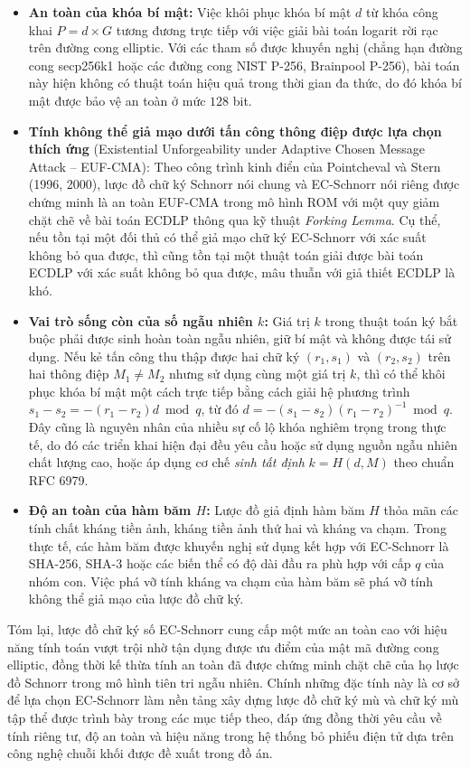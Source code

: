 \begin{itemize}
    \item \textbf{An toàn của khóa bí mật:} Việc khôi phục khóa bí mật $d$ từ khóa công khai $P = d \times G$ tương đương trực tiếp với việc giải bài toán logarit rời rạc trên đường cong elliptic. Với các tham số được khuyến nghị (chẳng hạn đường cong secp256k1 hoặc các đường cong NIST P-256, Brainpool P-256), bài toán này hiện không có thuật toán hiệu quả trong thời gian đa thức, do đó khóa bí mật được bảo vệ an toàn ở mức $128$ bit.

    \item \textbf{Tính không thể giả mạo dưới tấn công thông điệp được lựa chọn thích ứng} (Existential Unforgeability under Adaptive Chosen Message Attack -- EUF-CMA): Theo công trình kinh điển của Pointcheval và Stern (1996, 2000), lược đồ chữ ký Schnorr nói chung và EC-Schnorr nói riêng được chứng minh là an toàn EUF-CMA trong mô hình ROM với một quy giảm chặt chẽ về bài toán ECDLP thông qua kỹ thuật \textit{Forking Lemma}. Cụ thể, nếu tồn tại một đối thủ có thể giả mạo chữ ký EC-Schnorr với xác suất không bỏ qua được, thì cũng tồn tại một thuật toán giải được bài toán ECDLP với xác suất không bỏ qua được, mâu thuẫn với giả thiết ECDLP là khó.

    \item \textbf{Vai trò sống còn của số ngẫu nhiên $k$:} Giá trị $k$ trong thuật toán ký bắt buộc phải được sinh hoàn toàn ngẫu nhiên, giữ bí mật và không được tái sử dụng. Nếu kẻ tấn công thu thập được hai chữ ký $(r_1, s_1)$ và $(r_2, s_2)$ trên hai thông điệp $M_1 \neq M_2$ nhưng sử dụng cùng một giá trị $k$, thì có thể khôi phục khóa bí mật một cách trực tiếp bằng cách giải hệ phương trình $s_1 - s_2 = -(r_1 - r_2) d \bmod q$, từ đó $d = -(s_1 - s_2)(r_1 - r_2)^{-1} \bmod q$. Đây cũng là nguyên nhân của nhiều sự cố lộ khóa nghiêm trọng trong thực tế, do đó các triển khai hiện đại đều yêu cầu hoặc sử dụng nguồn ngẫu nhiên chất lượng cao, hoặc áp dụng cơ chế \textit{sinh tất định} $k = H(d, M)$ theo chuẩn RFC 6979.

    \item \textbf{Độ an toàn của hàm băm $H$:} Lược đồ giả định hàm băm $H$ thỏa mãn các tính chất kháng tiền ảnh, kháng tiền ảnh thứ hai và kháng va chạm. Trong thực tế, các hàm băm được khuyến nghị sử dụng kết hợp với EC-Schnorr là SHA-256, SHA-3 hoặc các biến thể có độ dài đầu ra phù hợp với cấp $q$ của nhóm con. Việc phá vỡ tính kháng va chạm của hàm băm sẽ phá vỡ tính không thể giả mạo của lược đồ chữ ký.
\end{itemize}

Tóm lại, lược đồ chữ ký số EC-Schnorr cung cấp một mức an toàn cao với hiệu năng tính toán vượt trội nhờ tận dụng được ưu điểm của mật mã đường cong elliptic, đồng thời kế thừa tính an toàn đã được chứng minh chặt chẽ của họ lược đồ Schnorr trong mô hình tiên tri ngẫu nhiên. Chính những đặc tính này là cơ sở để lựa chọn EC-Schnorr làm nền tảng xây dựng lược đồ chữ ký mù và chữ ký mù tập thể được trình bày trong các mục tiếp theo, đáp ứng đồng thời yêu cầu về tính riêng tư, độ an toàn và hiệu năng trong hệ thống bỏ phiếu điện tử dựa trên công nghệ chuỗi khối được đề xuất trong đồ án.
